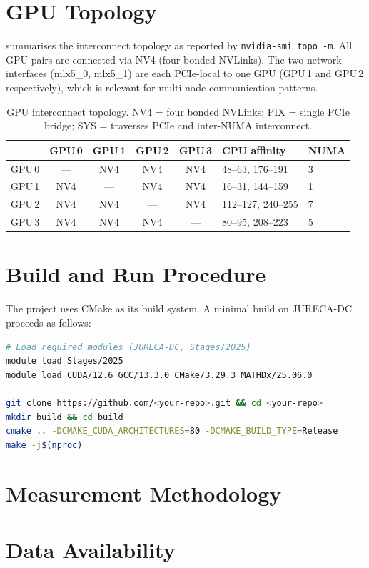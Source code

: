 \section{GPU Topology}\label{sec:repro-topology}

 summarises the interconnect topology as reported by \texttt{nvidia-smi topo -m}. All GPU pairs are connected via NV4 (four bonded NVLinks). The two network interfaces (mlx5\_0, mlx5\_1) are each PCIe-local to one GPU (GPU\,1 and GPU\,2 respectively), which is relevant for multi-node communication patterns.

\begin{table}[H]
\centering
\caption{GPU interconnect topology. NV4 = four bonded NVLinks; PIX = single PCIe bridge; SYS = traverses PCIe and inter-NUMA interconnect.}
\label{tab:gpu-topology}
\begin{tabular}{l c c c c l l}
\toprule
 & GPU\,0 & GPU\,1 & GPU\,2 & GPU\,3 & CPU affinity & NUMA \\
\midrule
GPU\,0 & --- & NV4 & NV4 & NV4 & 48--63, 176--191 & 3 \\
GPU\,1 & NV4 & --- & NV4 & NV4 & 16--31, 144--159 & 1 \\
GPU\,2 & NV4 & NV4 & --- & NV4 & 112--127, 240--255 & 7 \\
GPU\,3 & NV4 & NV4 & NV4 & --- & 80--95, 208--223 & 5 \\
\bottomrule
\end{tabular}
\end{table}

\section{Build and Run Procedure}

The project uses CMake as its build system. A minimal build on JURECA-DC proceeds as follows:

\begin{lstlisting}[language=bash, caption={Build commands for JURECA-DC.}, label={lst:repro-build}]
# Load required modules (JURECA-DC, Stages/2025)
module load Stages/2025
module load CUDA/12.6 GCC/13.3.0 CMake/3.29.3 MATHDx/25.06.0

git clone https://github.com/<your-repo>.git && cd <your-repo>
mkdir build && cd build
cmake .. -DCMAKE_CUDA_ARCHITECTURES=80 -DCMAKE_BUILD_TYPE=Release
make -j$(nproc)
\end{lstlisting}

\section{Measurement Methodology}
\section{Data Availability}
